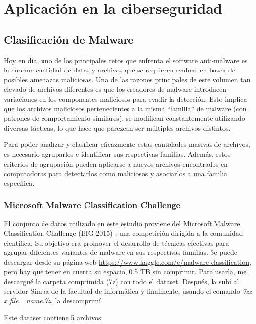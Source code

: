 \chapter{Aplicación en la ciberseguridad} \label{Capitulo_3}

\section{Clasificación de Malware}

Hoy en día, uno de los principales retos que enfrenta el software anti-malware es la enorme cantidad de datos y archivos que se requieren evaluar en busca de posibles amenazas maliciosas. Una de las razones principales de este volumen tan elevado de archivos diferentes es que los creadores de malware introducen variaciones en los componentes maliciosos para evadir la detección. Esto implica que los archivos maliciosos pertenecientes a la misma ``familia'' de malware (con patrones de comportamiento similares), se modifican constantemente utilizando diversas tácticas, lo que hace que parezcan ser múltiples archivos distintos. 


Para poder analizar y clasificar eficazmente estas cantidades masivas de archivos, es necesario agruparlos e identificar sus respectivas familias. Además, estos criterios de agrupación pueden aplicarse a nuevos archivos encontrados en computadoras para detectarlos como maliciosos y asociarlos a una familia específica. 


\subsection{Microsoft Malware Classification Challenge}



El conjunto de datos utilizado en este estudio proviene del Microsoft Malware Classification Challenge (BIG 2015) \citep{kagglebig2015}, una competición dirigida a la comunidad científica. Su objetivo era promover el desarrollo de técnicas efectivas para agrupar diferentes variantes de malware en sus respectivas familias. Se puede descargar desde su página web \url{https://www.kaggle.com/c/malware-classification}, pero hay que tener en cuenta su espacio, 0.5 TB sin comprimir. Para usarla, me descargué la carpeta comprimida (7z) con todo el dataset. Después, la subí al servidor Simba de la facultad de informática y finalmente, usando el comando \textit{7zz x file\_ name.7z}, la descomprimí. 


Este dataset contiene 5 archivos:

